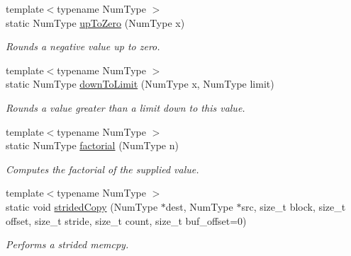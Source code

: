 \begin{DoxyCompactItemize}
{\footnotesize template$<$typename Num\+Type $>$ }\\static Num\+Type \hyperlink{class_grid_utils_a5a3e26a94e62833f0a9e5a4bda066dac}{up\+To\+Zero} (Num\+Type x)
\begin{DoxyCompactList}\small\item\em Rounds a negative value up to zero. \end{DoxyCompactList}\item 
{\footnotesize template$<$typename Num\+Type $>$ }\\static Num\+Type \hyperlink{class_grid_utils_abd4068e22339d5272ca551f8cbddec26}{down\+To\+Limit} (Num\+Type x, Num\+Type limit)
\begin{DoxyCompactList}\small\item\em Rounds a value greater than a limit down to this value. \end{DoxyCompactList}\item 
{\footnotesize template$<$typename Num\+Type $>$ }\\static Num\+Type \hyperlink{class_grid_utils_a57edeaeba2d67d187a9edd0b560fe0c2}{factorial} (Num\+Type n)
\begin{DoxyCompactList}\small\item\em Computes the factorial of the supplied value. \end{DoxyCompactList}\item 
{\footnotesize template$<$typename Num\+Type $>$ }\\static void \hyperlink{class_grid_utils_aa3ca6e20ef4fa927cb845956d7565b1e}{strided\+Copy} (Num\+Type $\ast$dest, Num\+Type $\ast$src, size\+\_\+t block, size\+\_\+t offset, size\+\_\+t stride, size\+\_\+t count, size\+\_\+t buf\+\_\+offset=0)
\begin{DoxyCompactList}\small\item\em Performs a strided memcpy. \end{DoxyCompactList}\end{DoxyCompactItemize}

